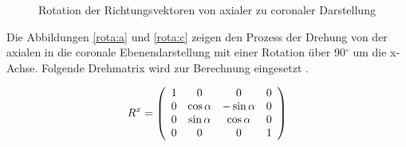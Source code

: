 \begin{figure}[tbp]
\centering
{}
\caption{Rotation der Richtungsvektoren von axialer zu coronaler Darstellung}
\label{rota}
\end{figure}


Die Abbildungen \ref{rota:a} und \ref{rota:c} zeigen den Prozess der Drehung von der axialen in die coronale Ebenendarstellung mit einer Rotation über 90$^\circ$ um die x-Achse.  Folgende Drehmatrix wird zur Berechnung eingesetzt \cite[7.3.2]{nisch:bv}. 

\begin{equation}
R^x=\left(
			\begin{array}{c} 1 \\ 0 \\ 0 \\ 0 \end{array}
			\begin{array}{c} 0 \\ \cos \alpha \\ \sin \alpha \\ 0 \end{array}
			\begin{array}{c} 0 \\ -\sin \alpha \\ \cos \alpha \\ 0 \end{array}
			\begin{array}{c} 0 \\ 0 \\ 0 \\ 1 \end{array}
		\right)
\vspace{0.5cm}
\label{rotation_x}
\end{equation}

